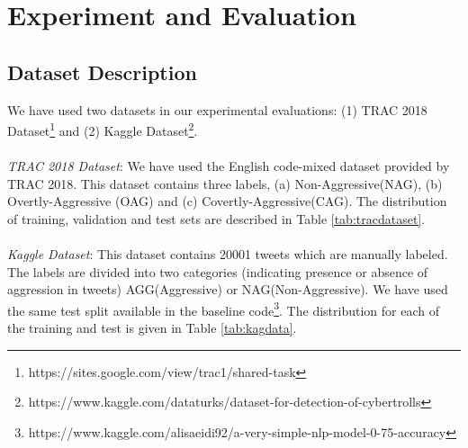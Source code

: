 \documentclass[sigconf]{acmart}
\begin{document}
\section{Experiment and Evaluation}\label{exp}
\subsection{Dataset Description}
We have used two datasets in our experimental evaluations: (1) TRAC 2018 Dataset\footnote{https://sites.google.com/view/trac1/shared-task} and (2) Kaggle Dataset\footnote{https://www.kaggle.com/dataturks/dataset-for-detection-of-cybertrolls}.\\
\\
\textit{TRAC 2018 Dataset}: We have used the English code-mixed dataset provided by TRAC 2018. This dataset contains three labels, (a) Non-Aggressive(NAG), (b) Overtly-Aggressive (OAG) and (c) Covertly-Aggressive(CAG). The distribution of training, validation and test sets are described in Table \ref{tab:tracdataset}.\\
\\
\textit{Kaggle Dataset}: This dataset contains 20001 tweets which are manually labeled. The labels are divided into two categories (indicating presence or absence of aggression in tweets) AGG(Aggressive) or NAG(Non-Aggressive). We have used the same test split available in the baseline code\footnote{https://www.kaggle.com/alisaeidi92/a-very-simple-nlp-model-0-75-accuracy}. The distribution for each of the training and test is given in Table \ref{tab:kagdata}.
\newcolumntype{b}{X}
\end{document}
